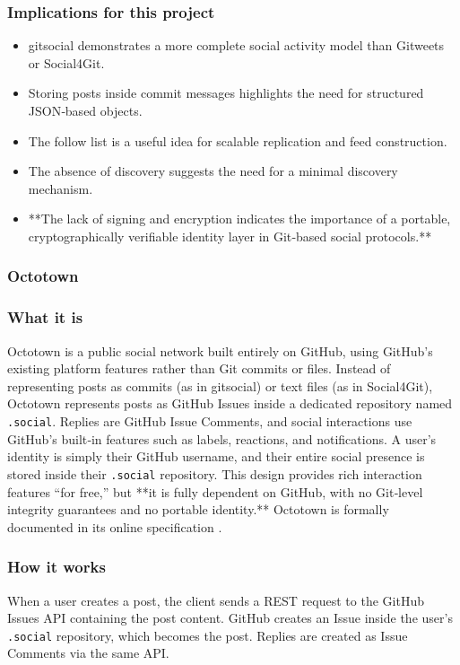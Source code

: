 \subsubsection*{Implications for this project}
\begin{itemize}
    \item gitsocial demonstrates a more complete social activity model than Gitweets or Social4Git.
    \item Storing posts inside commit messages highlights the need for structured JSON‑based objects.
    \item The follow list is a useful idea for scalable replication and feed construction.
    \item The absence of discovery suggests the need for a minimal discovery mechanism.
    \item **The lack of signing and encryption indicates the importance of a portable, cryptographically
    verifiable identity layer in Git‑based social protocols.**
\end{itemize}
\subsubsection{Octotown}

\subsubsection*{What it is}
Octotown is a public social network built entirely on GitHub, using GitHub’s existing platform
features rather than Git commits or files. Instead of representing posts as commits (as in gitsocial)
or text files (as in Social4Git), Octotown represents posts as GitHub Issues inside a dedicated
repository named \texttt{.social}. Replies are GitHub Issue Comments, and social interactions use
GitHub’s built‑in features such as labels, reactions, and notifications. A user’s identity is simply their
GitHub username, and their entire social presence is stored inside their \texttt{.social} repository. This
design provides rich interaction features “for free,” but **it is fully dependent on GitHub, with no Git‑level integrity guarantees and no portable identity.** Octotown is formally documented in its online specification \cite{octotown2026}.

\subsubsection*{How it works}
When a user creates a post, the client sends a REST request to the GitHub Issues API containing the
post content. GitHub creates an Issue inside the user’s \texttt{.social} repository, which becomes the
post. Replies are created as Issue Comments via the same API.

